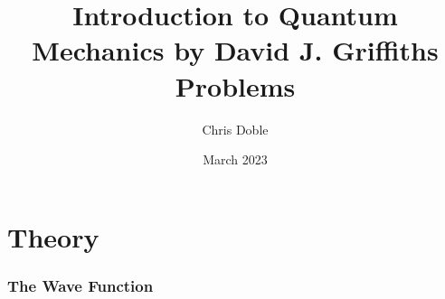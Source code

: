 \documentclass{article}
\title{Introduction to Quantum Mechanics by David J. Griffiths Problems}
\author{Chris Doble}
\date{March 2023}
\begin{document}
\maketitle

\tableofcontents

\part{Theory}

\section{The Wave Function}

\subsection{}
\end{document}
